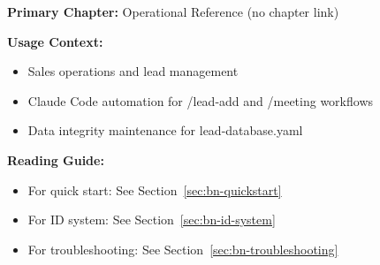 %
%

%
%
%
%
%

\begin{tcolorbox}[colback=purple!5!white, colframe=purple!75!black,
    title=Chapter Linkage]

\textbf{Primary Chapter:} Operational Reference (no chapter link)

\textbf{Usage Context:}
\begin{itemize}[nosep]
\item Sales operations and lead management
\item Claude Code automation for /lead-add and /meeting workflows
\item Data integrity maintenance for lead-database.yaml
\end{itemize}

\textbf{Reading Guide:}
\begin{itemize}[nosep]
\item For quick start: See Section~\ref{sec:bn-quickstart}
\item For ID system: See Section~\ref{sec:bn-id-system}
\item For troubleshooting: See Section~\ref{sec:bn-troubleshooting}
\end{itemize}

\end{tcolorbox}

